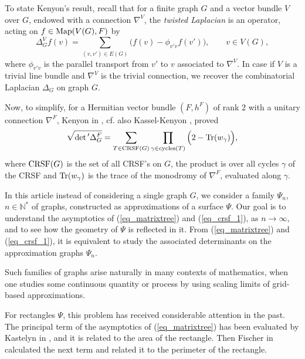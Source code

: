 \documentclass[12pt]{article}
\numberwithin{equation}{section}
\theoremstyle{theorem}
\theoremstyle{definition}
\theoremstyle{remark}
\newcommand{\nat}{\mathbb{N}}
\newcommand{\laplcomp}{\Delta}
\begin{document}
	\par 
	To state Kenyon's result, recall that for a finite graph $G$ and a vector bundle $V$ over $G$, endowed with a connection $\nabla^V$, the \textit{twisted Laplacian} is an operator, acting on $f \in {\rm{Map}}(V(G), F)$ by
	\begin{equation}\label{eq_comb_lapl_tw}
		\laplcomp_G^{V} f(v) = \sum_{(v, v') \in E(G)} \big( f(v) - \phi_{v' v} f(v') \big), \qquad v \in V(G),
	\end{equation}	
	where $\phi_{v' v}$ is the parallel transport from $v'$ to $v$ associated to $\nabla^V$. In case if $V$ is a trivial line bundle and $\nabla^V$ is the trivial connection, we recover the combinatorial Laplacian $\laplcomp_G$ on graph $G$.
	\par 
	Now, to simplify, for a Hermitian vector bundle $(F, h^F)$ of rank $2$ with a unitary connection $\nabla^F$, Kenyon in \cite[Theorems 8, 9]{KenyonFlatVecBun}, cf. also Kassel-Kenyon \cite[Theorem 15]{KassKenyon}, proved 
	\begin{equation}\label{eq_crsf_1}
		\sqrt{\smash[b]{\det{}' \laplcomp_{G}^{F}}} = \sum_{T \in {\rm{CRSF}}(G)} \prod_{\gamma \in {\rm{cycles}}(T)} \Big( 2 - {\rm{Tr}}(w_{\gamma}) \Big),
	\end{equation}
	where ${\rm{CRSF}}(G)$ is the set of all CRSF's on $G$, the product is over all cycles $\gamma$ of the CRSF and ${\rm{Tr}}(w_{\gamma})$ is the trace of the monodromy of $\nabla^F$, evaluated along $\gamma$.
	\par 
	In this article instead of considering a single graph $G$, we consider a family $\Psi_n$, $n \in \nat^*$ of graphs, constructed as approximations of a surface $\Psi$. Our goal is to understand the asymptotics of (\ref{eq_matrixtree}) and (\ref{eq_crsf_1}), as $n \to \infty$, and to see how the geometry of $\Psi$ is reflected in it.
	From (\ref{eq_matrixtree}) and (\ref{eq_crsf_1}), it is equivalent to study the associated determinants on the approximation graphs $\Psi_n$.
	\par 
	Such families of graphs arise naturally in many contexts of mathematics, when one studies some continuous quantity or process by using scaling limits of grid-based approximations.
	\par For rectangles $\Psi$, this problem has received considerable attention in the past.
	The principal term of the asymptotics of (\ref{eq_matrixtree}) has been evaluated by Kastelyn in \cite{KastelynEntropy}, and it is related to the area of the rectangle.
	Then Fischer in \cite{Fisch61} calculated the next term and related it to the perimeter of the rectangle.
\end{document}
